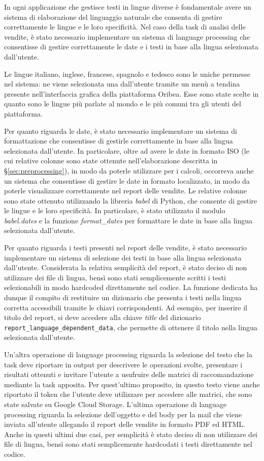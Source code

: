 In ogni applicazione che gestisce testi in lingue diverse è fondamentale avere un sistema di elaborazione del linguaggio naturale che consenta di gestire correttamente le lingue e le loro specificità. Nel caso della task di analisi delle vendite, è stato necessario implementare un sistema di language processing che consentisse di gestire correttamente le date e i testi in base alla lingua selezionata dall'utente.

Le lingue italiano, inglese, francese, spagnolo e tedesco sono le uniche permesse nel sistema: ne viene selezionata una dall'utente tramite un menù a tendina presente nell'interfaccia grafica della piattaforma Oribea. Esse sono state scelte in quanto sono le lingue più parlate al mondo e le più comuni tra gli utenti del piattaforma.

Per quanto riguarda le date, è stato necessario implementare un sistema di formattazione che consentisse di gestirle correttamente in base alla lingua selezionata dall'utente. In particolare, oltre ad avere le date in formato ISO (le cui relative colonne sono state ottenute nell'elaborazione descritta in \S\ref{sec:preprocessing}), in modo da poterle utilizzare per i calcoli, occorreva anche un sistema che consentisse di gestire le date in formato localizzato, in modo da poterle visualizzare correttamente nel report delle vendite.
Le relative colonne sono state ottenuto utilizzando la libreria \emph{babel} di Python, che consente di gestire le lingue e le loro specificità. In particolare, è stato utilizzato il modulo \emph{babel.dates} e la funzione \emph{format\_dates} per formattare le date in base alla lingua selezionata dall'utente.

Per quanto riguarda i testi presenti nel report delle vendite, è stato necessario implementare un sistema di selezione dei testi in base alla lingua selezionata dall'utente. Considerata la relativa semplicità del report, è stato deciso di non utilizzare dei file di lingua, bensì sono stati semplicemente scritti i testi selezionabili in modo \gls{hardcoded} direttamente nel codice.
La funzione dedicata ha dunque il compito di restituire un dizionario che presenta i testi nella lingua corretta accessibili tramite le chiavi corrispondenti. Ad esempio, per inserire il titolo del report, si deve accedere alla chiave \emph{title} del dizionario \texttt{report\_language\_dependent\_data}, che permette di ottenere il titolo nella lingua selezionata dall'utente.

Un'altra operazione di language processing riguarda la selezione del testo che la task deve riportare in output per descrivere le operazioni svolte, presentare i risultati ottenuti e invitare l'utente a usufruire delle matrici di raccomandazione mediante la task apposita. Per quest'ultimo proposito, in questo testo viene anche riportato il token che l'utente deve utilizzare per accedere alle matrici, che sono state salvate su Google Cloud Storage.
L'ultima operazione di language processing riguarda la selezione dell'oggetto e del body per la mail che viene inviata all'utente allegando il report delle vendite in formato PDF ed HTML.
Anche in questi ultimi due casi, per semplicità è stato deciso di non utilizzare dei file di lingua, bensì sono stati semplicemente hardcodati i testi direttamente nel codice.


